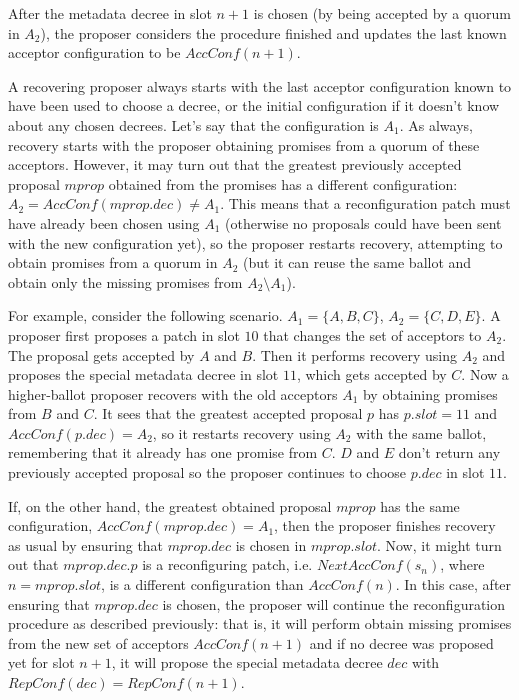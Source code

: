 \documentclass[12pt,a4paper,en]{pracamgr}
\begin{document}
After the metadata decree in slot $n+1$ is chosen (by being accepted by a quorum in $A_2$), the proposer considers the procedure finished and updates the last known acceptor configuration to be $AccConf(n+1)$.

A recovering proposer always starts with the last acceptor configuration known to have been used to choose a decree, or the initial configuration if it doesn't know about any chosen decrees. Let's say that the configuration is $A_1$. As always, recovery starts with the proposer obtaining promises from a quorum of these acceptors. However, it may turn out that the greatest previously accepted proposal $mprop$ obtained from the promises has a different configuration: $A_2 = AccConf(mprop.dec) \neq A_1$. This means that a reconfiguration patch must have already been chosen using $A_1$ (otherwise no proposals could have been sent with the new configuration yet), so the proposer restarts recovery, attempting to obtain promises from a quorum in $A_2$ (but it can reuse the same ballot and obtain only the missing promises from $A_2 \setminus A_1$).

For example, consider the following scenario. $A_1 = \{A, B, C\}$, $A_2 = \{C, D, E\}$. A proposer first proposes a patch in slot $10$ that changes the set of acceptors to $A_2$. The proposal gets accepted by $A$ and $B$. Then it performs recovery using $A_2$ and proposes the special metadata decree in slot $11$, which gets accepted by $C$. Now a higher-ballot proposer recovers with the old acceptors $A_1$ by obtaining promises from $B$ and $C$. It sees that the greatest accepted proposal $p$ has $p.slot = 11$ and $AccConf(p.dec) = A_2$, so it restarts recovery using $A_2$ with the same ballot, remembering that it already has one promise from $C$. $D$ and $E$ don't return any previously accepted proposal so the proposer continues to choose $p.dec$ in slot $11$.

If, on the other hand, the greatest obtained proposal $mprop$ has the same configuration, $AccConf(mprop.dec) = A_1$, then the proposer finishes recovery as usual by ensuring that $mprop.dec$ is chosen in $mprop.slot$. Now, it might turn out that $mprop.dec.p$ is a reconfiguring patch, i.e. $NextAccConf(s_n)$, where $n = mprop.slot$, is a different configuration than $AccConf(n)$. In this case, after ensuring that $mprop.dec$ is chosen, the proposer will continue the reconfiguration procedure as described previously: that is, it will perform obtain missing promises from the new set of acceptors $AccConf(n+1)$ and if no decree was proposed yet for slot $n+1$, it will propose the special metadata decree $dec$ with $RepConf(dec) = RepConf(n+1)$.
\end{document}
